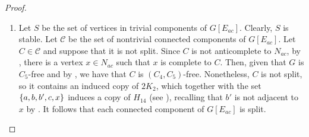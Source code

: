 \begin{proof}
\begin{enumerate}[label=(\roman*)]
\begin{figure}[htb!]
                \caption{An induced copy of $H_4$ given that $G[E_{bd}]$ is not
                    a cluster}
                \label{fig:type_3bag_3}
            \end{figure}
        
        \item Let $S$ be the set of vertices in trivial components of
            $G[E_{ac}]$. Clearly, $S$ is stable. Let $\mathcal{C}$ be the set of
            nontrivial connected components of $G[E_{ac}]$. Let $C\in
            \mathcal{C}$ and suppose that it is not split. Since $C$ is not
            anticomplete to $N_{ac}$, by , there is a vertex
            $x\in N_{ac}$ such that $x$ is complete to $C$. Then, given that $G$
            is $C_5$-free and by , we have that $C$ is
            $(C_4,C_5)$-free. Nonetheless, $C$ is not split, so it contains an
            induced copy of $2K_2$, which together with the set $\left\{a,b,b',c,x\right\}$
            induces a copy of $H_{14}$ (see ), recalling
            that $b'$ is not adjacent to $x$ by . It follows
            that each connected component of $G[E_{ac}]$ is split.

            \begin{figure}[htb!]
                \centering
\end{figure}
\end{enumerate}
\end{proof}
